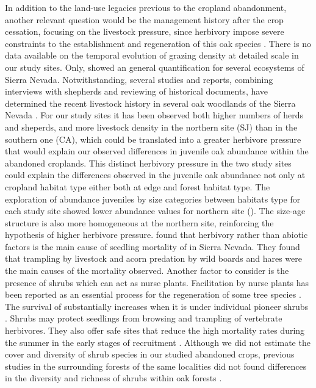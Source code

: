 In addition to the land-use legacies previous to the cropland abandonment, another relevant question would be the management history after the crop cessation, focusing on the livestock pressure, since herbivory impose severe constraints to the establishment and regeneration of this oak species \autocites{Gomez2003ImpactVertebrate, Pereaetal2014InteraccionesPlantaanimal}. There is no data available on the temporal evolution of grazing density at detailed scale in our study sites. Only, \citet{RoblesCruz2008ConjuntoSierras} showed an general quantification for several ecosystems of Sierra Nevada. Notwithstanding, several studies and reports, combining interviews with shepherds and reviewing of historical documents, have determined the recent livestock history in several oak woodlands of the Sierra Nevada \autocites{MorenoLlorcaetal2016HistoricalAnalysis, MorenoLlorcaetal2014CaracterizacionFuentes,MorenoLlorcaZamora2012CaracterizacionCarga}. For our study sites it has been observed both higher numbers of herds and sheperds, and more livestock density in the northern site (SJ) than in the southern one (CA), which could be translated into a greater herbivore pressure that would explain our observed differences in juvenile oak abundance within the abandoned croplands. This distinct herbivory pressure in the two study sites could explain the differences observed in the juvenile oak abundance not only at cropland habitat type either both at edge and forest habitat type. The exploration of abundance juveniles by size categories between habitats type for each study site showed lower abundance values for northern site (). The size-age structure is also more homogeneous at the northern site, reinforcing the hypothesis of higher herbivore pressure. \citet{Gomez2003ImpactVertebrate} found that herbivory rather than abiotic factors is the main cause of seedling mortality of \Qp in Sierra Nevada. They found that trampling by livestock and acorn predation by wild boards and hares were the main causes of the mortality observed. Another factor to consider is the presence of shrubs which can act as nurse plants. Facilitation by nurse plants has been reported as an essential process for the regeneration of some tree species  \autocites{Castroetal2006RestoringQuercus,GomezAparicioetal2004ApplyingPlant}. The survival of \Qp substantially increases when it is under individual pioneer shrubs \autocite{Castroetal2006RestoringQuercus,Costaetal2017CanNative}. Shrubs may protect \Qp seedlings from browsing and trampling of vertebrate herbivores. They also offer safe sites that reduce the high mortality rates during the summer in the early stages of recruitment \autocites{Castroetal2006RestoringQuercus,Barazaetal2004HerbivoryHas}. Although we did not estimate the cover and diversity of shrub species in our studied abandoned crops, previous studies in the surrounding forests of the same localities did not found differences in the diversity and richness of shrubs within oak forests \autocite{Munoz2014BosquesAutoctonos}. 

